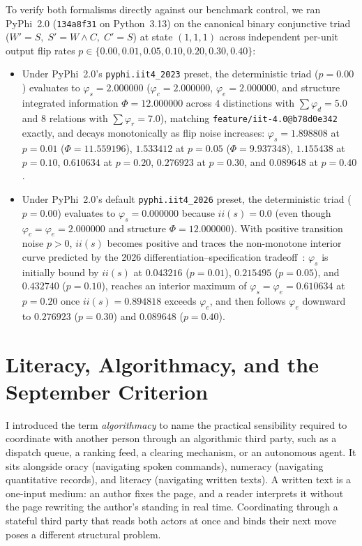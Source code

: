 \documentclass[11pt,a4paper]{article}
\begin{document}
To verify both formalisms directly against our benchmark control, we ran PyPhi~2.0 (\texttt{134a8f31} on Python~3.13) on the canonical binary conjunctive triad ($W' = S,\; S' = W \wedge C,\; C' = S$) at state $(1, 1, 1)$ across independent per-unit output flip rates $p \in \{0.00, 0.01, 0.05, 0.10, 0.20, 0.30, 0.40\}$:
\begin{itemize}[leftmargin=1.8em,itemsep=0.2em]
  \item Under PyPhi~2.0's \texttt{pyphi.iit4\_2023} preset, the deterministic triad ($p = 0.00$) evaluates to $\varphi_s = 2.000000$ ($\varphi_c = 2.000000$, $\varphi_e = 2.000000$, and structure integrated information $\Phi = 12.000000$ across $4$ distinctions with $\sum \varphi_d = 5.0$ and $8$ relations with $\sum \varphi_r = 7.0$), matching \texttt{feature/iit-4.0@b78d0e342} exactly, and decays monotonically as flip noise increases: $\varphi_s = 1.898808$ at $p = 0.01$ ($\Phi = 11.559196$), $1.533412$ at $p = 0.05$ ($\Phi = 9.937348$), $1.155438$ at $p = 0.10$, $0.610634$ at $p = 0.20$, $0.276923$ at $p = 0.30$, and $0.089648$ at $p = 0.40$.
  \item Under PyPhi~2.0's default \texttt{pyphi.iit4\_2026} preset, the deterministic triad ($p = 0.00$) evaluates to $\varphi_s = 0.000000$ because $\mathit{ii}(s) = 0.0$ (even though $\varphi_c = \varphi_e = 2.000000$ and structure $\Phi = 12.000000$). With positive transition noise $p > 0$, $\mathit{ii}(s)$ becomes positive and traces the non-monotone interior curve predicted by the 2026 differentiation--specification tradeoff~\cite{mayner2026intrinsic}: $\varphi_s$ is initially bound by $\mathit{ii}(s)$ at $0.043216$ ($p = 0.01$), $0.215495$ ($p = 0.05$), and $0.432740$ ($p = 0.10$), reaches an interior maximum of $\varphi_s = \varphi_e = 0.610634$ at $p = 0.20$ once $\mathit{ii}(s) = 0.894818$ exceeds $\varphi_e$, and then follows $\varphi_e$ downward to $0.276923$ ($p = 0.30$) and $0.089648$ ($p = 0.40$).
\end{itemize}

\section{Literacy, Algorithmacy, and the September Criterion}

I introduced the term \emph{algorithmacy} to name the practical sensibility required to coordinate with another person through an algorithmic third party, such as a dispatch queue, a ranking feed, a clearing mechanism, or an autonomous agent. It sits alongside oracy (navigating spoken commands), numeracy (navigating quantitative records), and literacy (navigating written texts). A written text is a one-input medium: an author fixes the page, and a reader interprets it without the page rewriting the author's standing in real time. Coordinating through a stateful third party that reads both actors at once and binds their next move poses a different structural problem.
\end{document}
